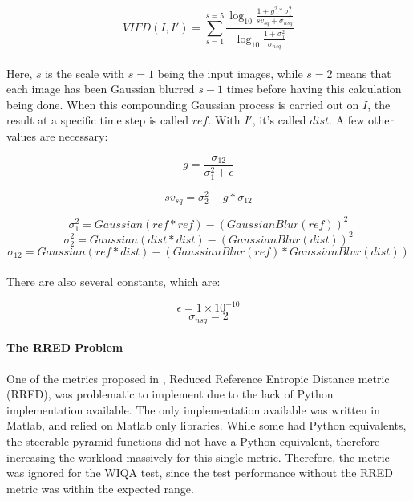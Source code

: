 \documentclass[10pt,a4paper]{article}
\begin{document}
                $$VIFD(I, I') = \sum_{s = 1}^{s=5} \frac{
                        \log_{10} 
                        \frac{1 + g^2 * \sigma_{1}^2}
                        {sv_{sq} + \sigma_{nsq}}
                    }{
                        \log_{10}
                        \frac{1 + \sigma_{1}^2}
                        {\sigma_{nsq}}
                    }$$\\

                Here, $s$ is the scale with $s=1$ being the input images, while $s=2$ means that each image has been Gaussian blurred $s-1$ times before having this calculation being done.
                When this compounding Gaussian process is carried out on $I$, the result at a specific time step is called $ref$. With $I'$, it's called $dist$.
                A few other values are necessary:


                $$g = \frac{\sigma_{12}}{\sigma_{1}^2 + \epsilon}$$
                
                $$sv_{sq} = \sigma_{2}^2 - g*\sigma_{12}$$

                $$\sigma_{1}^2 = Gaussian(ref * ref) - (GaussianBlur(ref))^2$$
                $$\sigma_{2}^2 = Gaussian(dist * dist) - (GaussianBlur(dist))^2$$
                $$\sigma_{12} = Gaussian(ref * dist) - (GaussianBlur(ref) * GaussianBlur(dist))$$\\


                There are also several constants, which are:


                $$\epsilon = 1 \times 10^{-10}$$
                $$\sigma_{nsq} = 2$$

            \paragraph{The RRED Problem}
            One of the metrics proposed in \cite{ImageQualityAssessmentTest}, Reduced Reference Entropic Distance metric (RRED), was problematic to implement due to the lack of Python implementation available.
            The only implementation available was written in Matlab, and relied on Matlab only libraries. While some had Python equivalents, the steerable pyramid
            functions did not have a Python equivalent, therefore increasing the workload massively for this single metric. Therefore, the metric was ignored for the WIQA
            test, since the test performance without the RRED metric was within the expected range. 
            
            
\end{document}
